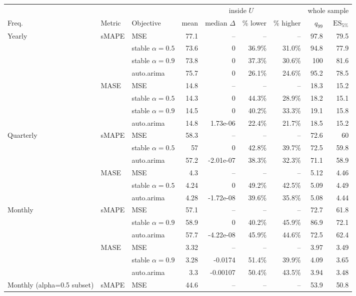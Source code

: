 \begin{tabular}{lllrrrrrr}
\toprule
 & & & \multicolumn{4}{c}{inside $U$} & \multicolumn{2}{c}{whole sample} \\
\cmidrule(lr){4-7}\cmidrule(lr){8-9}
Freq. & Metric & Objective & mean & median $\Delta$ & \% lower & \% higher & $q_{99}$ & $\mathrm{ES}_{5\%}$ \\
\midrule
Yearly & sMAPE & MSE & 77.1 & -- & -- & -- & 97.8 & 79.5 \\
 &  & stable $\alpha=0.5$ & 73.6 & 0 & 36.9\% & 31.0\% & 94.8 & 77.9 \\
 &  & stable $\alpha=0.9$ & 73.8 & 0 & 37.3\% & 30.6\% & 100 & 81.6 \\
 &  & auto.arima & 75.7 & 0 & 26.1\% & 24.6\% & 95.2 & 78.5 \\
 & MASE & MSE & 14.8 & -- & -- & -- & 18.3 & 15.2 \\
 &  & stable $\alpha=0.5$ & 14.3 & 0 & 44.3\% & 28.9\% & 18.2 & 15.1 \\
 &  & stable $\alpha=0.9$ & 14.5 & 0 & 40.2\% & 33.3\% & 19.1 & 15.8 \\
 &  & auto.arima & 14.8 & 1.73e-06 & 22.4\% & 21.7\% & 18.5 & 15.2 \\
\addlinespace
Quarterly & sMAPE & MSE & 58.3 & -- & -- & -- & 72.6 & 60 \\
 &  & stable $\alpha=0.5$ & 57 & 0 & 42.8\% & 39.7\% & 72.5 & 59.8 \\
 &  & auto.arima & 57.2 & -2.01e-07 & 38.3\% & 32.3\% & 71.1 & 58.9 \\
 & MASE & MSE & 4.3 & -- & -- & -- & 5.12 & 4.46 \\
 &  & stable $\alpha=0.5$ & 4.24 & 0 & 49.2\% & 42.5\% & 5.09 & 4.49 \\
 &  & auto.arima & 4.28 & -1.72e-08 & 39.6\% & 35.8\% & 5.08 & 4.44 \\
\addlinespace
Monthly & sMAPE & MSE & 57.1 & -- & -- & -- & 72.7 & 61.8 \\
 &  & stable $\alpha=0.9$ & 58.9 & 0 & 40.2\% & 45.9\% & 86.9 & 72.1 \\
 &  & auto.arima & 57.7 & -4.22e-08 & 45.9\% & 44.6\% & 72.5 & 62.4 \\
 & MASE & MSE & 3.32 & -- & -- & -- & 3.97 & 3.49 \\
 &  & stable $\alpha=0.9$ & 3.28 & -0.0174 & 51.4\% & 39.9\% & 4.09 & 3.65 \\
 &  & auto.arima & 3.3 & -0.00107 & 50.4\% & 43.5\% & 3.94 & 3.48 \\
\addlinespace
Monthly (alpha=0.5 subset) & sMAPE & MSE & 44.6 & -- & -- & -- & 53.9 & 50.8 \\

\end{tabular}
